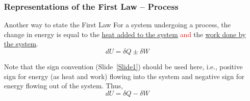 \documentclass[10pt,compress]{beamer}
\newcommand{\red}{\textcolor{red}}
\begin{document}
\begin{frame}
 \frametitle{Representations of the First Law -- Process}
 \begin{block}{Another way to state the First Law} 
  For a system undergoing a process, the change in energy is equal to the \underline{heat added to the system} \red{and} the \underline{work done by the system}.
  \begin{displaymath}
     dU =\delta Q \pm \delta W 
  \end{displaymath}
 \end{block}
Note that the sign convention (Slide~\ref{Slide1}) should be used here, i.e., positive sign for energy (as heat and work) flowing into the system and negative sign for energy flowing out of the system. Thus,
  \begin{equation}
     dU =\delta Q - \delta W 
  \end{equation}
\end{frame}
\end{document}
